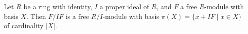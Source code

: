 Let $R$ be a ring with identity, $I$ a proper ideal of $R$, and $F$ a free $R$-module with basis $X$. Then $F/IF$ is a free $R/I$-module with basis $\pi(X) = \{x + IF \mid x \in X\}$ of cardinality $|X|$.
